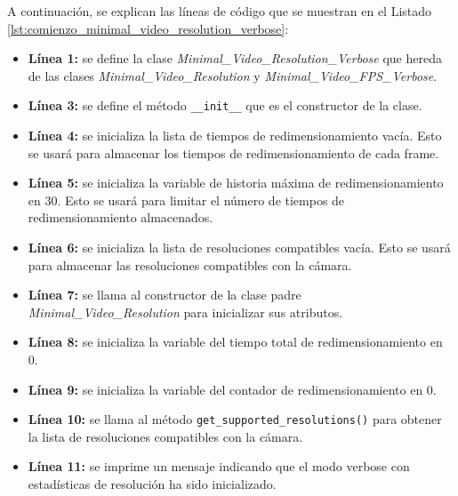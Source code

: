 A continuación, se explican las líneas de código que se muestran en el Listado \ref{lst:comienzo_minimal_video_resolution_verbose}:
\begin{itemize}
    \item \textbf{Línea 1:} se define la clase \textit{Minimal\_Video\_Resolution\_Verbose} que hereda de las clases \textit{Minimal\_Video\_Resolution} y \textit{Minimal\_Video\_FPS\_Verbose}.
    \item \textbf{Línea 3:} se define el método \texttt{\_\_init\_\_} que es el constructor de la clase.
    \item \textbf{Línea 4:} se inicializa la lista de tiempos de redimensionamiento vacía. Esto se usará para almacenar los tiempos de redimensionamiento de cada frame.
    \item \textbf{Línea 5:} se inicializa la variable de historia máxima de redimensionamiento en 30. Esto se usará para limitar el número de tiempos de redimensionamiento almacenados.
    \item \textbf{Línea 6:} se inicializa la lista de resoluciones compatibles vacía. Esto se usará para almacenar las resoluciones compatibles con la cámara.
    \item \textbf{Línea 7:} se llama al constructor de la clase padre \textit{Minimal\_Video\_Resolution} para inicializar sus atributos.
    \item \textbf{Línea 8:} se inicializa la variable del tiempo total de redimensionamiento en 0.
    \item \textbf{Línea 9:} se inicializa la variable del contador de redimensionamiento en 0.
    \item \textbf{Línea 10:} se llama al método \texttt{get\_supported\_resolutions()} para obtener la lista de resoluciones compatibles con la cámara.
    \item \textbf{Línea 11:} se imprime un mensaje indicando que el modo verbose con estadísticas de resolución ha sido inicializado.
\end{itemize}
\vspace{\baselineskip}

